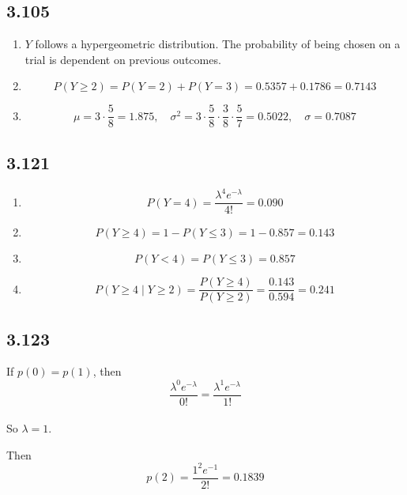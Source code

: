 \documentclass[
  letterpaper,
  DIV=11,
  numbers=noendperiod]{scrartcl}
\begin{document}
\subsection{3.105}\label{section-7}

\begin{enumerate}
\def\labelenumi{(\alph{enumi})}
\item
  \(Y\) follows a hypergeometric distribution. The probability of being
  chosen on a trial is dependent on previous outcomes.
\item
  \[P(Y \geq 2) = P(Y=2) + P(Y=3) = 0.5357 + 0.1786 = 0.7143\]
\item
  \[\mu = 3 \cdot \frac{5}{8} = 1.875, \quad \sigma^2 = 3 \cdot \frac{5}{8} \cdot \frac{3}{8} \cdot \frac{5}{7} = 0.5022, \quad \sigma = 0.7087\]
\end{enumerate}

\subsection{3.121}\label{section-8}

\begin{enumerate}
\def\labelenumi{(\alph{enumi})}
\item
  \[P(Y=4) = \frac{\lambda^4 e^{-\lambda}}{4!} = 0.090\]
\item
  \[P(Y \geq 4) = 1 - P(Y \leq 3) = 1 - 0.857 = 0.143\]
\item
  \[P(Y < 4) = P(Y \leq 3) = 0.857\]
\item
  \[P(Y \geq 4 \mid Y \geq 2) = \frac{P(Y \geq 4)}{P(Y \geq 2)} = \frac{0.143}{0.594} = 0.241\]
\end{enumerate}

\subsection{3.123}\label{section-9}

If \(p(0) = p(1)\), then\\
\[\frac{\lambda^0 e^{-\lambda}}{0!} = \frac{\lambda^1 e^{-\lambda}}{1!}\]\\
So \(\lambda = 1\).

Then\\
\[p(2) = \frac{1^2 e^{-1}}{2!} = 0.1839\]
\end{document}
